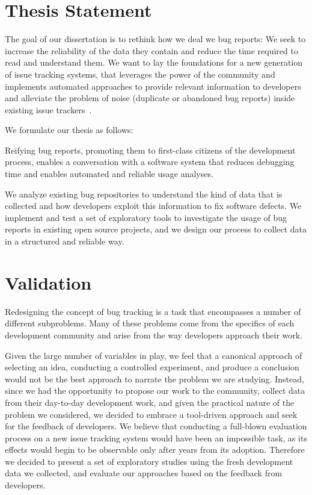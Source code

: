 

\section{Thesis Statement}\label{sec:thesis}

The goal of our dissertation is to rethink how we deal we bug reports: We seek to increase the reliability of the data they contain and reduce the time required to read and understand them. We want to lay the foundations for a new generation of issue tracking systems, that leverages the power of the community and implements automated approaches to provide relevant information to developers~\cite{Zimm2010a} and alleviate the problem of noise (\ie duplicate or abandoned bug reports) inside existing issue trackers~\cite{Wang2008a}.

\filbreak

We formulate our thesis as follows:

\begin{framed}
Reifying bug reports, promoting them to first-class citizens of the development process, enables a conversation with a software system that reduces debugging time and enables automated and reliable usage analyses.
\end{framed}


We analyze existing bug repositories to understand the kind of data that is collected and how developers exploit this information to fix software defects.
We implement and test a set of exploratory tools to investigate the usage of bug reports in existing open source projects, and we design our process to collect data in a structured and reliable way.


\section{Validation}

Redesigning the concept of bug tracking is a task that encompasses a number of different subproblems.
Many of these problems come from the specifics of each development community and arise from the way developers approach their work.

Given the large number of variables in play, we feel that a canonical approach of selecting an idea, conducting a controlled experiment, and produce a conclusion would not be the best approach to narrate the problem we are studying.
Instead, since we had the opportunity to propose our work to the \pha community, collect data from their day-to-day development work, and given the practical nature of the problem we considered, we decided to embrace a tool-driven approach and seek for the feedback of developers.
We believe that conducting a full-blown evaluation process on a new issue tracking system would have been an impossible task, as its effects would begin to be observable only after years from its adoption.
Therefore we decided to present a set of exploratory studies using the fresh development data we collected, and evaluate our approaches based on the feedback from developers.


